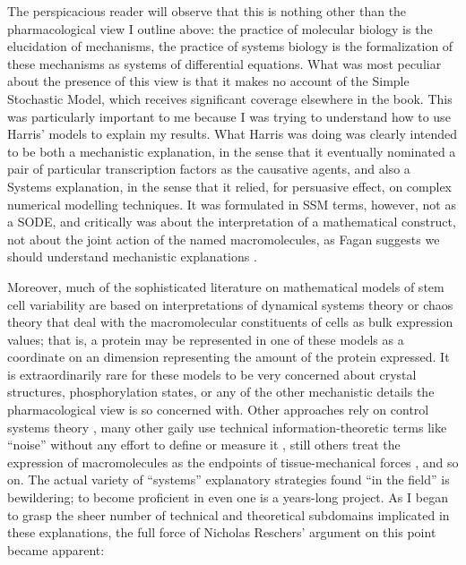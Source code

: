 The perspicacious reader will observe that this is nothing other than the pharmacological view I outline above: the practice of molecular biology is the elucidation of mechanisms, the practice of systems biology is the formalization of these mechanisms as systems of differential equations. What was most peculiar about the presence of this view is that it makes no account of the Simple Stochastic Model, which receives significant coverage elsewhere in the book. This was particularly important to me because I was trying to understand how to use Harris' models to explain my results. What Harris was doing was clearly intended to be both a mechanistic explanation, in the sense that it eventually nominated a pair of particular transcription factors as the causative agents, and also a Systems explanation, in the sense that it relied, for persuasive effect, on complex numerical modelling techniques. It was formulated in SSM terms, however, not as a SODE, and critically was about the interpretation of a mathematical construct, not about the joint action of the named macromolecules, as Fagan suggests we should understand mechanistic explanations \cite{Fagan2013}.

Moreover, much of the sophisticated literature on mathematical models of stem cell variability are based on interpretations of dynamical systems theory or chaos theory \cite{Furusawa2012,Huang2017} that deal with the macromolecular constituents of cells as bulk expression values; that is, a protein may be represented in one of these models as a coordinate on an dimension representing the amount of the protein expressed. It is extraordinarily rare for these models to be very concerned about crystal structures, phosphorylation states, or any of the other mechanistic details the pharmacological view is so concerned with. Other approaches rely on control systems theory \cite{Sun2015,Yang2015a}, many other gaily use technical information-theoretic terms like ``noise'' without any effort to define or measure it \cite{Chang2008}, still others treat the expression of macromolecules as the endpoints of tissue-mechanical forces \cite{Peng2017}, and so on. The actual variety of ``systems'' explanatory strategies found ``in the field'' is bewildering; to become proficient in even one is a years-long project. As I began to grasp the sheer number of technical and theoretical subdomains implicated in these explanations, the full force of Nicholas Reschers' argument on this point became apparent: 

